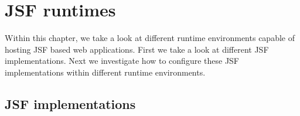 %

\chapter{JSF runtimes}
Within this chapter, we take a look at different runtime environments capable of hosting JSF based web applications.
First we take a look at different JSF implementations.
Next we investigate how to configure these JSF implementations within different runtime environments.

\section{JSF implementations}

